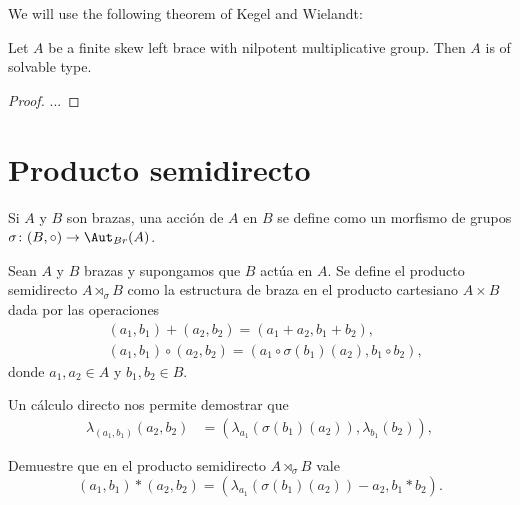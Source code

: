 

\chapter{}

We will use the following theorem of Kegel and Wielandt:

\begin{theorem}
\end{theorem}

\begin{theorem}

Let $A$ be a finite skew left brace with nilpotent multiplicative group. Then $A$ is of solvable type.
\end{theorem}

\begin{proof}
...
\end{proof}


\chapter{Producto semidirecto}

Si $A$ y $B$ son brazas, una acción de $A$ en $B$ se define
como un morfismo de grupos $\sigma\colon (B,\circ)\to\Aut_{Br}(A)$.

\begin{definition}
Sean $A$ y $B$ brazas y supongamos que $B$ actúa en $A$.  Se 
define el producto semidirecto 
$A\rtimes_{\sigma}B$ como la estructura de braza 
en el producto cartesiano $A\times B$ 
dada por las operaciones
\begin{align*}
&(a_1,b_1)+(a_2,b_2)=(a_1+a_2,b_1+b_2),\\
&(a_1,b_1)\circ (a_2,b_2)=(a_1\circ\sigma(b_1)(a_2),b_1\circ b_2),
\end{align*}
donde $a_1,a_2\in A$ y $b_1,b_2\in B$.
\end{definition}

Un cálculo directo nos permite demostrar que
\begin{align}
\lambda_{(a_1,b_1)}(a_2,b_2)&=(\lambda_{a_1}(\sigma(b_1)(a_2)),\lambda_{b_1}(b_2)),
\end{align}

\begin{exercise}
Demuestre que en el producto semidirecto $A\rtimes_{\sigma}B$ vale 
\[
(a_1,b_1)*(a_2,b_2)=(\lambda_{a_1}(\sigma(b_1)(a_2))-a_2,b_1*b_2).
\]
\end{exercise}


